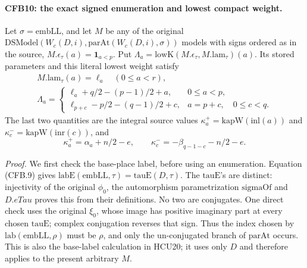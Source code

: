 \paragraph{CFB10: the exact signed enumeration and lowest compact weight.}
\label{claim:CFB10}
Let \(\sigma=\mathrm{embLL}\), and let \(M\) be any of the
original \(\mathrm{DSModel}(W_c(D,i),\mathrm{parAt}(W_c(D,i),\sigma))\)
models with signs ordered as in the source,
\(M.\epsilon_\tau(a)=\mathbf1_{a<p}\).
Put \(\Lambda_a=\mathrm{lowK}(M.\epsilon_\tau,M.\mathrm{lam}_\tau)(a)\).
Its stored parameters and this literal lowest weight satisfy
\[
 \begin{gathered}
       M.\mathrm{lam}_\tau(a)=\ell_a\quad(0\le a<r),\\
 \Lambda_a=\begin{cases}
       \ell_a+q/2-(p-1)/2+a,&0\le a<p,\\
       \ell_{p+c}-p/2-(q-1)/2+c,&a=p+c,\quad0\le c<q.
 \end{cases}
 \end{gathered}                                                 \tag{CFB.30}
\]
The last two quantities are the integral source values
\(\kappa^+_a=\mathrm{kapW}(\mathrm{inl}(a))\) and
\(\kappa^-_c=\mathrm{kapW}(\mathrm{inr}(c))\), and
\[
        \kappa^+_a=\alpha_a+n/2-e,\qquad
        \kappa^-_c=-\beta_{q-1-c}-n/2-e.                        \tag{CFB.31}
\]

\emph{Proof.}
We first check the base-place label, before using an enumeration.
Equation (CFB.9) gives
\(\mathrm{labE}(\mathrm{embLL},\tau)=\mathrm{tauE}(D,\tau)\).
The \(\mathrm{tauE}\)'s are distinct: injectivity of the original
\(\phi_0\), the automorphism parametrization \(\mathrm{sigmaOf}\)
and \(D.eTau\) proves this from their definitions.
No two are conjugates.  One direct check uses the original
\(\xi_0\), whose image has positive imaginary part at every
chosen \(\mathrm{tauE}\); complex conjugation reverses that sign.
Thus the index chosen by \(\mathrm{lab}(\mathrm{embLL},\rho)\)
must be \(\rho\), and only the un-conjugated branch of
\(\mathrm{parAt}\) occurs.  This is also the base-label calculation
in HCU20; it uses only \(D\) and therefore applies to the present
arbitrary \(M\).


